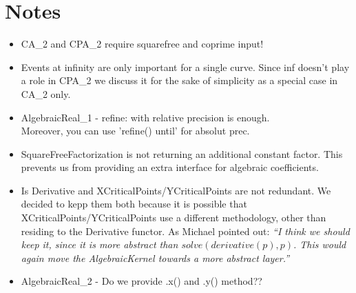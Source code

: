 \section{Notes}
\begin{itemize}
 \item CA\_2 and CPA\_2 require squarefree and coprime input! 
 \item Events at infinity are only important for a single curve. Since
   inf doesn't play a role in CPA\_2 we discuss it for the sake of
   simplicity as a special case in CA\_2 only. 
\item AlgebraicReal\_1 - refine: with relative precision is enough. \\
      Moreover, you can use 'refine() until' for absolut prec.
\item SquareFreeFactorization is not returning an additional constant 
      factor. This prevents us from providing an extra interface for 
      algebraic coefficients.
 \item Is Derivative and XCriticalPoints/YCriticalPoints are not
   redundant. We decided to kepp them both because it is possible that
   XCriticalPoints/YCriticalPoints use a different methodology, other
   than residing to the Derivative functor. As Michael pointed out:
   \emph{``I think we should keep it, since it is more abstract than
     $solve(derivative(p),p)$.  This would again move the {\em
       AlgebraicKernel} towards a more abstract layer.''}
 \item AlgebraicReal\_2 - Do we provide .x() and .y() method??\\\end{itemize}

